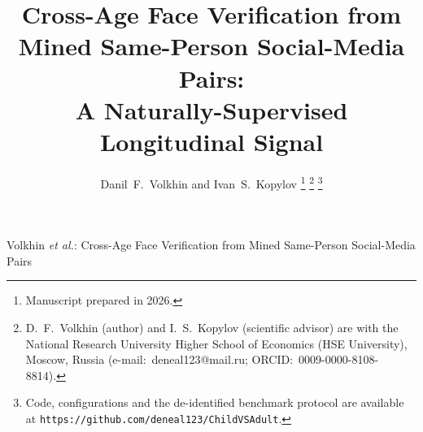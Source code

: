 \documentclass[journal]{IEEEtran}
\begin{document}
\title{Cross-Age Face Verification from Mined Same-Person Social-Media Pairs:\\ A Naturally-Supervised Longitudinal Signal}

\author{Danil~F.~Volkhin and Ivan~S.~Kopylov
\thanks{Manuscript prepared in 2026.}
\thanks{D.~F.~Volkhin (author) and I.~S.~Kopylov (scientific advisor) are with the National Research University Higher School of Economics (HSE University), Moscow, Russia (e-mail:~deneal123@mail.ru; ORCID:~0009-0000-8108-8814).}
\thanks{Code, configurations and the de-identified benchmark protocol are available at \texttt{https://github.com/deneal123/ChildVSAdult}.}}

{Volkhin \MakeLowercase{\textit{et al.}}: Cross-Age Face Verification from Mined Same-Person Social-Media Pairs}
\end{document}
